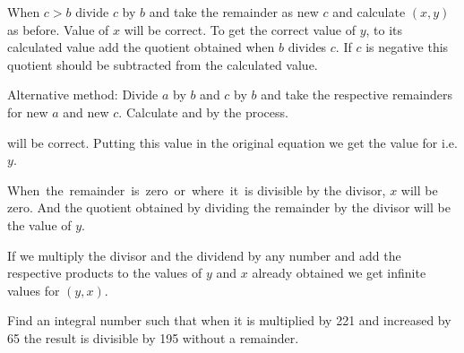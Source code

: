 \documentclass[]{article}
\begin{document}
{{When $c>b$ divide $c$ by $b$ and take the remainder as new $c$ and
calculate $(x, y)$ as before. Value of $x$ will be correct. To get the
correct value of $y$, to its calculated value add the quotient obtained
when $b$ divides $c$. If $c$ is negative this quotient should be subtracted
from the calculated value.}

\begin{quote}  {
}  \end{quote}

{Alternative method: Divide $a$ by $b$ and $c$ by $b$ and take the respective
remainders for new $a$ and new $c$. Calculate {} and {} by the process.
{} }
\newpage
\large

\noindent will be correct. Putting this value in the original equation we get the
value for {} i.e. $y.$

\begin{quote}  {
}  \end{quote}

When \,the \,remainder \,is \,zero \,or \,where \,it \,is divisible by the divisor, $x$
will be zero. And the quotient obtained by dividing the remainder by the
divisor will be the value of $y$.

\begin{quote}  {
}  \end{quote}

{If we multiply the divisor and the dividend by any number and add the
respective products to the values of $y$ and $x$ already obtained we get
infinite values for $(y, x).$}

\begin{quote}  {
}  \end{quote}

{Find an integral number such that when it is multiplied by 221 and
increased by 65 the result is divisible by 195 without a remainder.}

}
\end{document}
